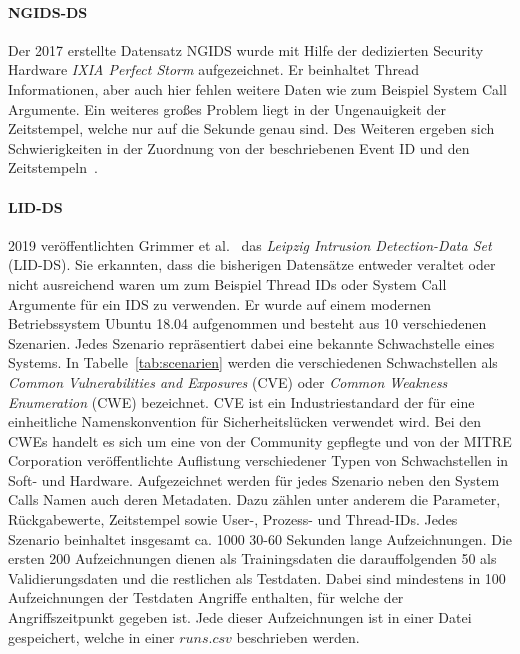             \paragraph{NGIDS-DS}
                Der 2017 erstellte Datensatz NGIDS \cite{NGIDS} wurde mit Hilfe der dedizierten Security Hardware \textit{IXIA Perfect Storm} aufgezeichnet.
                Er beinhaltet Thread Informationen, aber auch hier fehlen weitere Daten wie zum Beispiel System Call Argumente.
                Ein weiteres großes Problem liegt in der Ungenauigkeit der Zeitstempel, welche nur auf die Sekunde genau sind.
                Des Weiteren ergeben sich Schwierigkeiten in der Zuordnung von der beschriebenen Event ID und den Zeitstempeln~\cite{LIDDS}.
            \paragraph{LID-DS}
                2019 veröffentlichten Grimmer et al.~\cite{LIDDS} das \textit{Leipzig Intrusion Detection-Data Set} (LID-DS).
                Sie erkannten, dass die bisherigen Datensätze entweder veraltet oder nicht ausreichend waren um zum Beispiel Thread IDs oder System Call Argumente für ein IDS zu verwenden.
                Er wurde auf einem modernen Betriebssystem Ubuntu 18.04 aufgenommen und besteht aus 10 verschiedenen Szenarien.
                Jedes Szenario repräsentiert dabei eine bekannte Schwachstelle eines Systems.
                In Tabelle~\ref{tab:scenarien} werden die verschiedenen Schwachstellen als \textit{Common Vulnerabilities and Exposures} (CVE)
                 oder \textit{Common Weakness Enumeration} (CWE)  bezeichnet.
                CVE ist ein Industriestandard der für eine einheitliche Namenskonvention für Sicherheitslücken verwendet wird.
                Bei den CWEs handelt es sich um eine von der Community gepflegte und von der MITRE Corporation veröffentlichte Auflistung verschiedener Typen von Schwachstellen in Soft- und Hardware.
                Aufgezeichnet werden für jedes Szenario neben den System Calls Namen auch deren Metadaten.
                Dazu zählen unter anderem die Parameter, Rückgabewerte, Zeitstempel sowie User-, Prozess- und Thread-IDs.
                Jedes Szenario beinhaltet insgesamt ca. 1000 30-60 Sekunden lange Aufzeichnungen.
                Die ersten 200 Aufzeichnungen dienen als Trainingsdaten die darauffolgenden 50 als Validierungsdaten und die restlichen als Testdaten. 
                Dabei sind mindestens in 100 Aufzeichnungen der Testdaten Angriffe enthalten, für welche der Angriffszeitpunkt gegeben ist.
                Jede dieser Aufzeichnungen ist in einer Datei gespeichert, welche in einer $runs.csv$ beschrieben werden.
                 
